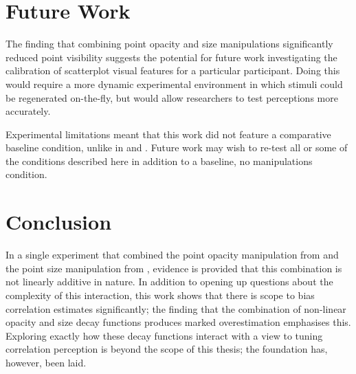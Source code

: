\documentclass[../main.tex]{subfiles}
\begin{document}
\section{Future Work}\label{future-work-e4}

The finding that combining point opacity and size manipulations
significantly reduced point visibility suggests the potential for future
work investigating the calibration of scatterplot visual features for a
particular participant. Doing this would require a more dynamic
experimental environment in which stimuli could be regenerated
on-the-fly, but would allow researchers to test perceptions more
accurately.

Experimental limitations meant that this work did not feature a
comparative baseline condition, unlike in 
and . Future work may wish to re-test all or
some of the conditions described here in addition to a baseline, no
manipulations condition.

\section{Conclusion}\label{conclusion-interactions}

In a single experiment that combined the point opacity manipulation from
 and the point size manipulation from
, evidence is provided that this combination
is not linearly additive in nature. In addition to opening up questions
about the complexity of this interaction, this work shows that there is
scope to bias correlation estimates significantly; the finding that the
combination of non-linear opacity and size decay functions produces
marked overestimation emphasises this. Exploring exactly how these decay
functions interact with a view to tuning correlation perception is
beyond the scope of this thesis; the foundation has, however, been laid.
\end{document}
